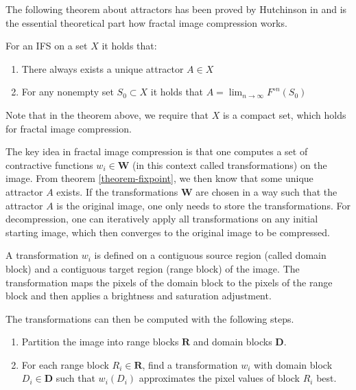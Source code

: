 The following theorem about attractors has been proved by Hutchinson in
\cite{hutchinson1981fractals} and is the essential theoretical part how fractal
image compression works.

\begin{theorem}\label{theorem-fixpoint}
  For an IFS on a set $X$ it holds that:

  \begin{enumerate}[topsep=0pt,itemsep=-1ex,partopsep=1ex,parsep=1ex]
    \item There always exists a unique attractor $A \in X$
    \item For any nonempty set $S_0 \subset X$ it holds that
      $A = \lim_{n \to \infty} F^{\circ n}(S_0)$
  \end{enumerate}
\end{theorem}

Note that in the theorem above, we require that $X$ is a compact set, which
holds for fractal image compression.

 The key idea in fractal image compression
is that one computes a set of contractive functions $w_i \in \boldsymbol{W}$ (in
this context called transformations) on the image. From theorem
\ref{theorem-fixpoint}, we then know that some unique attractor $A$ exists. If
the transformations $\boldsymbol{W}$ are chosen in a way such that the attractor
$A$ is the original image, one only needs to store the transformations. For
decompression, one can iteratively apply all transformations on any initial
starting image, which then converges to the original image to be compressed.

A transformation $w_i$ is defined on a contiguous source region (called domain
block) and a contiguous target region (range block) of the image. The
transformation maps the pixels of the domain block to the pixels of the range
block and then applies a brightness and saturation adjustment.

The transformations can then be computed with the following steps.

\begin{enumerate}[topsep=0pt,itemsep=-1ex,partopsep=1ex,parsep=1ex]
  \item Partition the image into range blocks $\boldsymbol{R}$ and domain blocks
    $\boldsymbol{D}$.
  \item For each range block $R_i \in \boldsymbol{R}$, find a transformation
    $w_i$ with domain block $D_i \in \boldsymbol{D}$ such that $w_i(D_i)$
    approximates the pixel values of block $R_i$ best.
\end{enumerate}

